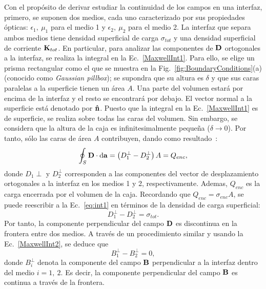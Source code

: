 Con el propósito de derivar estudiar la continuidad de los campos en una interfaz, primero, se suponen dos medios, cada uno caracterizado por sus propiedades ópticas: $\epsilon_{1},\:\mu_{1}$ para el medio 1 y $\epsilon_{2},\:\mu_{2}$ para el medio 2. La interfaz que separa ambos medios tiene densidad superficial de carga $\sigma_{tot}$ y una densidad superficial de corriente $\vb{K}_{tot}$. En particular, para analizar las componentes de $\vb{D}$ ortogonales a la interfaz, se realiza la integral en la Ec.~\eqref{MaxwellInt1}. Para ello, se elige un prisma rectangular como el que se muestra en la Fig.~\ref{fig:BoundaryConditions}(a) (conocido como \textit{Gaussian pillbox}); se supondra que su altura es $\delta$ y que sus caras paralelas a la superficie tienen un área $A$. Una parte del volumen estará por encima de la interfaz y el resto se encontrará por debajo. El vector normal a la superficie está denotado por $\vu{n}$. Puesto que la integral en la Ec.~\eqref{MaxwellInt1} es de superficie, se realiza sobre todas las caras del volumen. Sin embargo, se considera que la altura de la caja es infinitesimalmente pequeña ($\delta\to 0$). Por tanto, sólo las caras de área $A$ contribuyen, dando como resultado~\cite{Griffiths}: 
\begin{equation}
\begin{split}
\oint_{S}\vb{D}\cdot\dd{\vb{a}}=\left(D_{1}^{\perp}-D_{2}^{\perp}\right)A=Q_{enc},\label{eq:int1}
\end{split}
\end{equation}
donde $D_{1}\perp$ y $D_{2}^{\perp}$ corresponden a las componentes del vector de desplazamiento ortogonales a la interfaz en los medios 1 y 2, respectivamente. Ademas, $Q_{enc}$ es la carga encerrada por el volumen de la caja. Recordando que $Q_{enc}=\sigma_{enc}A$, se puede reescribir a la Ec.~\eqref{eq:int1} en términos de la densidad de carga superficial:
\begin{equation}
D_{1}^{\perp}-D_{2}^{\perp}=\sigma_{tot}.
\end{equation}
Por tanto, la componente perpendicular del campo $\vb{D}$ es discontinua en la frontera entre dos medios.
A través de un procedimiento similar y usando la Ec.~\eqref{MaxwellInt2}, se deduce que~\cite{Griffiths}
\begin{equation}
B_{1}^{\perp}-B_{2}^{\perp}=0,
\end{equation}
donde $B_{i}^{\perp}$ denota la componente del campo $\vb{B}$ perpendicular a la interfaz dentro del medio $i=1,\:2$. Es decir, la componente perpendicular del campo $\vb{B}$ es continua a través de la frontera.

